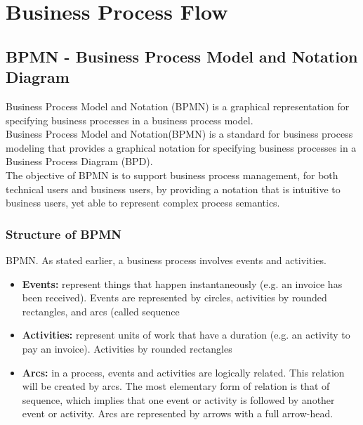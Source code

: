 \documentclass[a4paper,12pt]{report}
\begin{document}
\chapter{Business Process Flow}
\section{BPMN - Business Process Model and Notation Diagram }
Business Process Model and Notation (BPMN) is a graphical representation for specifying business processes in a business process model.\\
Business Process Model and Notation(BPMN) is a standard for business process modeling that provides a graphical notation for specifying business processes in a Business Process Diagram (BPD).\\
The objective of BPMN is to support business process management, for both technical users and business users, by providing a notation that is intuitive to business users, yet able to represent complex process semantics.\\

\subsection{Structure of BPMN}
BPMN. As stated earlier, a business process involves events and activities.
\begin{itemize}
\item{\textbf{Events:} represent things that happen instantaneously (e.g. an invoice has been received). Events are represented by circles, activities by rounded rectangles, and arcs (called sequence}
\item{\textbf{Activities:}  represent units of work that have a duration (e.g. an activity to
pay an invoice). Activities by rounded rectangles}
\item{\textbf{Arcs:} in a process, events and activities are logically related. This relation will be created by arcs. The most elementary form of relation is that of sequence, which implies that one event or activity  is followed by another event or activity. Arcs are represented by arrows with a full arrow-head.}

\end{itemize}
\end{document}
